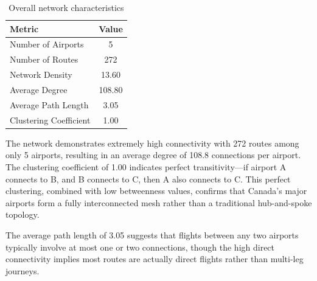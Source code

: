 \documentclass[9pt]{article}
\begin{document}
\begin{table}[h!]
    \centering
    \caption{Overall network characteristics}
    \begin{tabular}{lc}
        \toprule
        Metric & Value \\
        \midrule
        Number of Airports       & 5 \\
        Number of Routes         & 272 \\
        Network Density          & 13.60 \\
        Average Degree           & 108.80 \\
        Average Path Length      & 3.05 \\
        Clustering Coefficient   & 1.00 \\
        \bottomrule
    \end{tabular}
\end{table}

The network demonstrates extremely high connectivity with 272 routes among only 5 airports, resulting in an average degree of 108.8 connections per airport. The clustering coefficient of 1.00 indicates perfect transitivity---if airport A connects to B, and B connects to C, then A also connects to C. This perfect clustering, combined with low betweenness values, confirms that Canada's major airports form a fully interconnected mesh rather than a traditional hub-and-spoke topology.

The average path length of 3.05 suggests that flights between any two airports typically involve at most one or two connections, though the high direct connectivity implies most routes are actually direct flights rather than multi-leg journeys.
\end{document}

